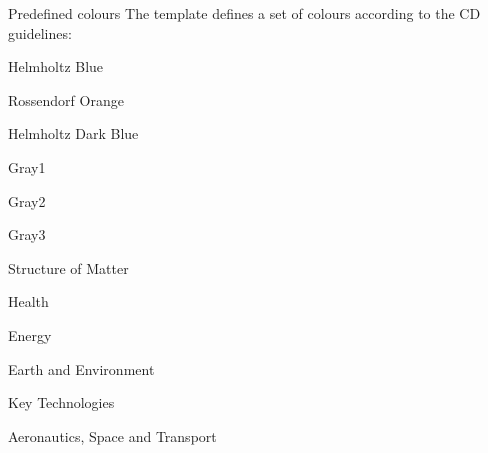 \begin{frame}{Predefined colours}
  The template defines a set of colours according to the CD guidelines:\par
  \begin{itemize}
      \begin{minipage}[t]{0.5\linewidth}
      \item \textcolor{hzdr-blue}{Helmholtz Blue}    
      \item \textcolor{hzdr-orange}{Rossendorf Orange}  
      \item \textcolor{hzdr-darkblue}{Helmholtz Dark Blue}
      \item \textcolor{hzdr-gray1}{Gray1}   
      \item \textcolor{hzdr-gray2}{Gray2}   
      \item \textcolor{hzdr-gray3}{Gray3}   
      \item \textcolor{hzdr-struct}{Structure of Matter}  
      \end{minipage}%
      \begin{minipage}[t]{0.5\linewidth}
      \item \textcolor{hzdr-health}{Health}  
      \item \textcolor{hzdr-energy}{Energy}  
      \item \textcolor{hzdr-earth}{Earth and Environment}   
      \item \textcolor{hzdr-keytec}{Key Technologies}  
      \item \textcolor{hzdr-aero}{Aeronautics, Space and Transport}
      \end{minipage}
  \end{itemize}
\end{frame}

